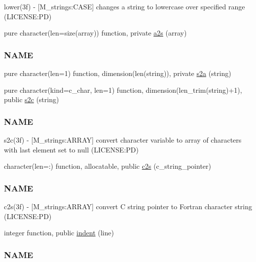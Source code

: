 \begin{DoxyCompactItemize}
\begin{DoxyCompactList}
lower(3f) -\/ \mbox{[}M\+\_\+strings\+:C\+A\+SE\mbox{]} changes a string to lowercase over specified range (L\+I\+C\+E\+N\+SE\+:PD) \end{DoxyCompactList}\item 
pure character(len=size(array)) function, private \mbox{\hyperlink{namespacem__strings_a9365ae5277199446d93fc5208be2e9a5}{a2s}} (array)
\begin{DoxyCompactList}\small\item\em \subsubsection*{N\+A\+ME}\end{DoxyCompactList}\item 
pure character(len=1) function, dimension(len(string)), private \mbox{\hyperlink{namespacem__strings_a5b05f337c8851871a4fb0b3cf56663cd}{s2a}} (string)
\item 
pure character(kind=c\+\_\+char, len=1) function, dimension(len\+\_\+trim(string)+1), public \mbox{\hyperlink{namespacem__strings_a9a3d38d8e7c4212d63487b9b46bec3b7}{s2c}} (string)
\begin{DoxyCompactList}\small\item\em \subsubsection*{N\+A\+ME}

s2c(3f) -\/ \mbox{[}M\+\_\+strings\+:A\+R\+R\+AY\mbox{]} convert character variable to array of characters with last element set to null (L\+I\+C\+E\+N\+SE\+:PD) \end{DoxyCompactList}\item 
character(len=\+:) function, allocatable, public \mbox{\hyperlink{namespacem__strings_a0a8c0c16a34208351523068686cb743b}{c2s}} (c\+\_\+string\+\_\+pointer)
\begin{DoxyCompactList}\small\item\em \subsubsection*{N\+A\+ME}

c2s(3f) -\/ \mbox{[}M\+\_\+strings\+:A\+R\+R\+AY\mbox{]} convert C string pointer to Fortran character string (L\+I\+C\+E\+N\+SE\+:PD) \end{DoxyCompactList}\item 
integer function, public \mbox{\hyperlink{namespacem__strings_a020dcca7f01d33eedf28b17518a22b69}{indent}} (line)
\begin{DoxyCompactList}\small\item\em \subsubsection*{N\+A\+ME}


\end{DoxyCompactList}
\end{DoxyCompactItemize}
